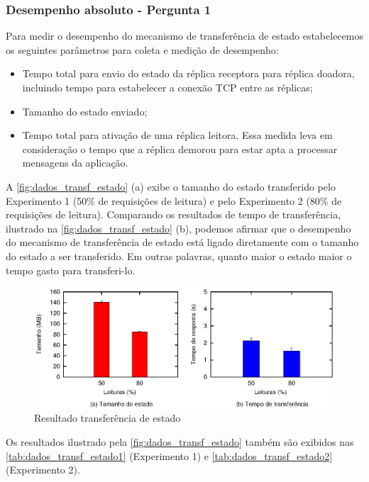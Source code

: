 \subsubsection{Desempenho absoluto - Pergunta 1}

Para medir o desempenho do mecanismo de transferência de estado estabelecemos os seguintes
parâmetros para coleta e medição de desempenho:

\begin{itemize}
  \item Tempo total para envio do estado da réplica receptora para réplica doadora,
    incluindo tempo para estabelecer a conexão TCP entre as réplicas;
  \item Tamanho do estado enviado;
  \item Tempo total para ativação de uma réplica leitora. Essa medida leva em consideração
    o tempo que a réplica demorou para estar apta a processar mensagens da aplicação.
\end{itemize}

A \autoref{fig:dados_transf_estado} (a) exibe o tamanho do estado transferido pelo
Experimento 1 (50\% de requisições de leitura) e pelo Experimento 2 (80\% de requisições
de leitura). Comparando os resultados de tempo de transferência, ilustrado na
\autoref{fig:dados_transf_estado} (b), podemos afirmar que o desempenho do mecanismo de
transferência de estado está ligado diretamente com o tamanho do estado a ser transferido.
Em outras palavras, quanto maior o estado maior o tempo gasto para transferi-lo.

\begin{figure}[ht]
  \centering
  \includegraphics[width=14cm]{conteudo/capitulos/figuras/dados-transf.eps}
  \caption{Resultado transferência de estado}
  \label{fig:dados_transf_estado}
\end{figure}

Os resultados ilustrado pela \autoref{fig:dados_transf_estado} também são exibidos nas
\autoref{tab:dados_transf_estado1} (Experimento 1) e \autoref{tab:dados_transf_estado2}
(Experimento 2).

